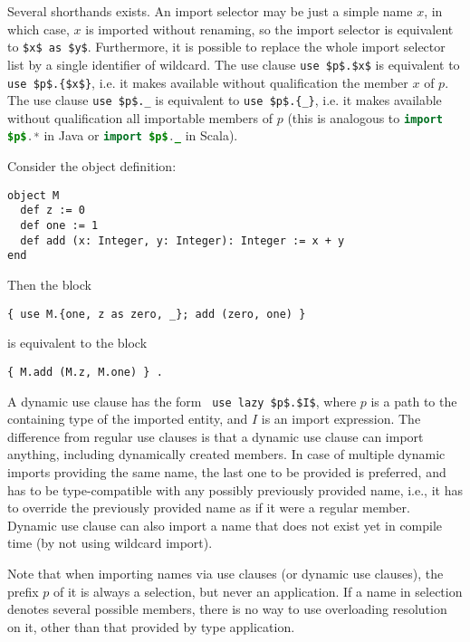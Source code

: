 Several shorthands exists. An import selector may be just a simple name $x$, in which case, $x$ is imported without renaming, so the import selector is equivalent to \lstinline!$x$ as $y$!. Furthermore, it is possible to replace the whole import selector list by a single identifier of wildcard. The use clause \lstinline!use $p$.$x$! is equivalent to \lstinline!use $p$.{$x$}!, i.e. it makes available without qualification the member $x$ of $p$. The use clause \lstinline!use $p$._! is equivalent to \lstinline!use $p$.{_}!, i.e. it makes available without qualification all importable members of $p$ (this is analogous to \lstinline[language=Java]!import $p$.*! in Java or \lstinline[language=Java]!import $p$._! in Scala). 

\example Consider the object definition:
\begin{lstlisting}
object M
  def z := 0
  def one := 1
  def add (x: Integer, y: Integer): Integer := x + y
end
\end{lstlisting}
Then the block
\begin{lstlisting}
{ use M.{one, z as zero, _}; add (zero, one) }
\end{lstlisting}
is equivalent to the block
\begin{lstlisting}
{ M.add (M.z, M.one) } .
\end{lstlisting}

A dynamic use clause has the form ~\lstinline!use lazy $p$.$I$!, where $p$ is a path to the containing type of the imported entity, and $I$ is an import expression. The difference from regular use clauses is that a dynamic use clause can import anything, including dynamically created members. In case of multiple dynamic imports providing the same name, the last one to be provided is preferred, and has to be type-compatible with any possibly previously provided name, i.e., it has to override the previously provided name as if it were a regular member. Dynamic use clause can also import a name that does not exist yet in compile time (by not using wildcard import). 

Note that when importing names via use clauses (or dynamic use clauses), the prefix $p$ of it is always a selection, but never an application. If a name in selection denotes several possible members, there is no way to use overloading resolution on it, other than that provided by type application. 





